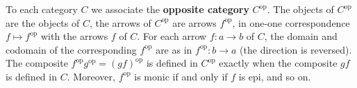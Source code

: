To each category $C$ we associate the \textbf{opposite category} $C^{\text{op}}$. The objects of $C^{\text{op}}$ are the objects of $C$, the arrows of $C^{\text{op}}$ are arrows $f^{\text{op}}$, in one-one correspondence $f \mapsto f^{\text{op}}$ with the arrows $f$ of $C$. For each arrow $f: a \to b$ of $C$, the domain and codomain of the corresponding $f^{\text{op}}$ are as in $f^{\text{op}}: b \to a$ (the direction is reversed). The composite $f^{\text{op}} g^{\text{op}} = (g f)^{\text{op}}$ is defined in $C^{\text{op}}$ exactly when the composite $g f$ is defined in $C$. Moreover, $f^{\text{op}}$ is monic if and only if $f$ is epi, and so on.
